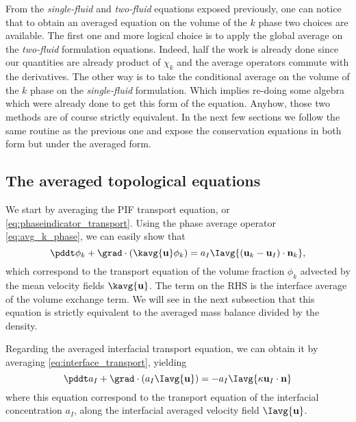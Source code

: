 From the \textit{single-fluid} and \textit{two-fluid} equations exposed previously, one can  notice that to obtain an averaged equation on the volume of the $k$ phase two choices are available. 
The first one and more logical choice is to apply the global average on the \textit{two-fluid} formulation equations.
Indeed, half the work is already done since our quantities are already product of $\chi_k$ and the average operators commute with the derivatives.
The other way is to take the conditional average on the volume of the $k$ phase on the \textit{single-fluid} formulation. 
Which implies re-doing some algebra which were already done to get this form of the 
equation.
Anyhow, those two methods are of course strictly equivalent.
In the next few sections we follow the same routine as the previous one and expose the conservation equations in both form but under the averaged form. 


\subsection{The averaged topological equations}

We start by averaging the PIF transport equation, or \ref{eq:phaseindicator_transport}. 
Using the phase average operator \ref{eq:avg_k_phase}, we can easily show that
\begin{equation}
    \pddt \phi_k 
    + \grad \cdot \left(
        \kavg{\textbf{u}}\phi_k 
    \right) 
    = a_I\Iavg{(\textbf{u}_k-\textbf{u}_I) \cdot \textbf{n}_k}, 
\end{equation}
which correspond to the transport equation of the volume fraction $\phi_k$ advected by the mean velocity fields $\kavg{\textbf{u}}$.
The term on the RHS is the interface average of the volume exchange term. 
We will see in the next subsection that this equation is strictly equivalent to the averaged mass balance divided by the density.

Regarding the averaged interfacial transport equation, we can obtain it by averaging \ref{eq:interface_transport}, yielding
\begin{equation}
    \pddt a_I
    + \grad \cdot \left(
        a_I
        \Iavg{\textbf{u}}
    \right)
    = - a_I \Iavg{\kappa \textbf{u}_I \cdot \textbf{n}}
    \label{eq:avg_I_a}
\end{equation}
where this equation correspond to the transport equation of the interfacial concentration $a_I$, along the interfacial averaged velocity field $\Iavg{\textbf{u}}$.

